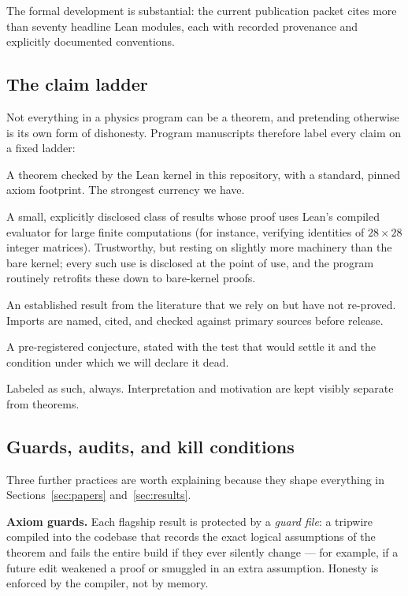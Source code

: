 \documentclass[11pt]{article}
\newcommand{\Kernel}{\textcolor{kernelcolor}{\textsc{Kernel}}}
\newcommand{\ImportMark}{\textcolor{classicalcolor}{\textsc{Import}}}
\newcommand{\ConjMark}{\textcolor{opencolor}{\textsc{Conjecture}}}
\begin{document}
The formal development is substantial: the current publication packet
cites more than seventy headline Lean modules, each with recorded
provenance and explicitly documented conventions.

\subsection{The claim ladder}

Not everything in a physics program can be a theorem, and pretending
otherwise is its own form of dishonesty.  Program manuscripts therefore
label every claim on a fixed ladder:

\begin{description}[style=nextline]
\item[\Kernel] A theorem checked by the Lean kernel in this repository,
  with a standard, pinned axiom footprint.  The strongest currency we
  have.
\item[Kernel + evaluator] A small, explicitly disclosed class of results
  whose proof uses Lean's compiled evaluator for large finite
  computations (for instance, verifying identities of $28\times 28$
  integer matrices).  Trustworthy, but resting on slightly more machinery
  than the bare kernel; every such use is disclosed at the point of use,
  and the program routinely retrofits these down to bare-kernel proofs.
\item[\ImportMark] An established result from the literature that we rely
  on but have not re-proved.  Imports are named, cited, and checked
  against primary sources before release.
\item[\ConjMark] A pre-registered conjecture, stated with the test that
  would settle it and the condition under which we will declare it dead.
\item[Speculation] Labeled as such, always.  Interpretation and motivation
  are kept visibly separate from theorems.
\end{description}

\subsection{Guards, audits, and kill conditions}

Three further practices are worth explaining because they shape everything
in Sections~\ref{sec:papers} and~\ref{sec:results}.

\textbf{Axiom guards.}  Each flagship result is protected by a
\emph{guard file}: a tripwire compiled into the codebase that records the
exact logical assumptions of the theorem and fails the entire build if
they ever silently change --- for example, if a future edit weakened a
proof or smuggled in an extra assumption.  Honesty is enforced by the
compiler, not by memory.
\end{document}
